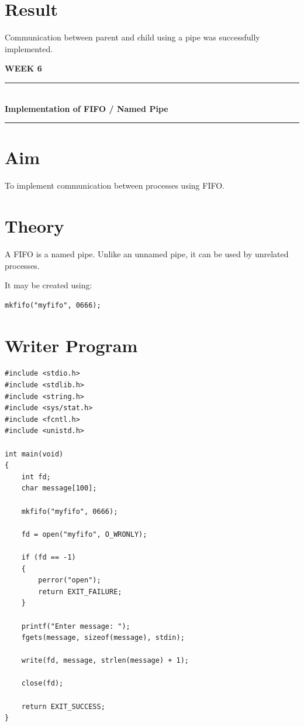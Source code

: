 \documentclass[12pt,a4paper]{report}
\newcommand{\experimenttitle}[2]{
\clearpage
\begin{center}
{\Large\bfseries\color{univblue} WEEK #1}\\[0.15cm]
\rule{\textwidth}{1pt}\\[0.2cm]
{\LARGE\bfseries #2}\\[0.2cm]
\rule{\textwidth}{1pt}
\end{center}
\vspace{0.4cm}
}
\begin{document}
\section*{Result}

Communication between parent and child using a pipe was successfully
implemented.


\experimenttitle{6}{Implementation of FIFO / Named Pipe}

\section*{Aim}

To implement communication between processes using FIFO.

\section*{Theory}

A FIFO is a named pipe. Unlike an unnamed pipe, it can be used by unrelated
processes.

It may be created using:

\begin{verbatim}
mkfifo("myfifo", 0666);
\end{verbatim}

\section*{Writer Program}

\begin{lstlisting}
#include <stdio.h>
#include <stdlib.h>
#include <string.h>
#include <sys/stat.h>
#include <fcntl.h>
#include <unistd.h>

int main(void)
{
    int fd;
    char message[100];

    mkfifo("myfifo", 0666);

    fd = open("myfifo", O_WRONLY);

    if (fd == -1)
    {
        perror("open");
        return EXIT_FAILURE;
    }

    printf("Enter message: ");
    fgets(message, sizeof(message), stdin);

    write(fd, message, strlen(message) + 1);

    close(fd);

    return EXIT_SUCCESS;
}
\end{lstlisting}
\end{document}
